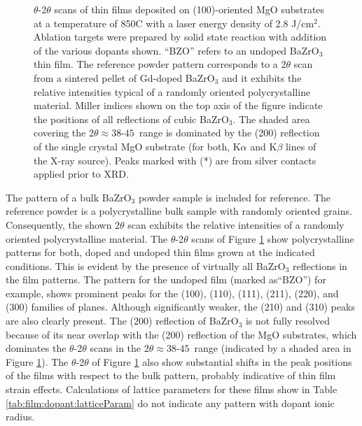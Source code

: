\begin{figure}
    \caption{$\theta$-2$\theta$ scans of thin films deposited on (100)-oriented MgO substrates at a temperature of 850\textdegree C with a laser energy density of 2.8 J/cm$^2$. Ablation targets were prepared by solid state reaction with addition of the various dopants shown. ``BZO'' refers to an undoped BaZrO$_3$ thin film. The reference powder pattern corresponds to a 2$\theta$ scan from a sintered pellet of Gd-doped BaZrO$_3$ and it exhibits the relative intensities typical of a randomly oriented polycrystalline material. Miller indices shown on the top axis of the figure indicate the positions of all reflections of cubic BaZrO$_3$. The shaded area covering the 2$\theta \approx 38$-$45$\textdegree\ range is dominated by the (200) reflection of the single crystal MgO substrate (for both, K$\alpha$ and K$\beta$ lines of the X-ray source). Peaks marked with (*) are from silver contacts applied prior to XRD.}
    \label{fig:xrd:films:dopants:oneAxis}
\end{figure}
The pattern of a bulk BaZrO$_3$ powder sample is included for reference. The reference powder is a polycrystalline bulk sample with randomly oriented grains. Consequently, the shown 2$\theta$ scan exhibits the relative intensities of a randomly oriented polycrystalline material. The $\theta$-2$\theta$ scans of Figure \ref{fig:xrd:films:dopants:oneAxis} show polycrystalline patterns for both, doped and undoped thin films grown at the indicated conditions. This is evident by the presence of virtually all BaZrO$_3$ reflections in the film patterns. The pattern for the undoped film (marked as``BZO'') for example, shows prominent peaks for the (100), (110), (111), (211), (220), and (300) families of planes. Although significantly weaker, the (210) and (310) peaks are also clearly present. The (200) reflection of BaZrO$_3$ is not fully resolved because of its near overlap with the (200) reflection of the MgO substrates, which dominates the $\theta$-2$\theta$ scans in the 2$\theta \approx 38$-$45$\textdegree\ range (indicated by a shaded area in Figure \ref{fig:xrd:films:dopants:oneAxis}). The $\theta$-2$\theta$ of Figure \ref{fig:xrd:films:dopants:oneAxis} also show substantial shifts in the peak positions of the films with respect to the bulk pattern, probably indicative of thin film strain effects. Calculations of lattice parameters for these films show in Table \ref{tab:film:dopant:latticeParam} do not indicate any pattern with dopant ionic radius. 
